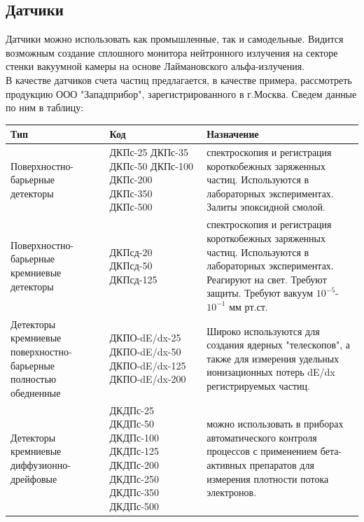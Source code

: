 \documentclass[11pt]{report}
\begin{document}
\subsection{Датчики}
Датчики можно использовать как промышленные, так и самодельные. Видится возможным создание сплошного монитора нейтронного излучения на секторе стенки вакуумной камеры на основе Лаймановского альфа-излучения. \\

В качестве датчиков счета частиц предлагается, в качестве примера, рассмотреть продукцию ООО "Западприбор", зарегистрированного в г.Москва. Сведем данные по ним в таблицу:\\
\begin{tabular}{|p{2.5cm}|p{3.5cm}|p{8.5cm}|}
\hline
	Тип & Код & Назначение\\
\hline
	Поверхностно-барьерные детекторы  & ДКПс-25 \linebreak ДКПс-35 \linebreak ДКПс-50 \linebreak ДКПс-100 \linebreak ДКПс-200 \linebreak ДКПс-350 \linebreak ДКПс-500 & спектроскопия и регистрация короткобежных заряженных частиц. Используются в лабораторных экспериментах. Залиты эпоксидной смолой.\\
\hline
	Поверхностно-барьерные кремниевые детекторы  & ДКПсд-20 \linebreak ДКПсд-50 \linebreak ДКПсд-125 & спектроскопия и регистрация короткобежных заряженных частиц. Используются в лабораторных экспериментах. Реагируют на свет. Требуют защиты. Требуют вакуум $10^{-5}$-$10^{-1}$ мм рт.ст.\\
\hline
	Детекторы кремниевые поверхностно-барьерные полностью обедненные & ДКПО-dE/dx-25 \linebreak ДКПО-dE/dx-50 \linebreak ДКПО-dE/dx-125 \linebreak ДКПО-dE/dx-200 & Широко используются для создания ядерных "телескопов", а также для измерения удельных ионизационных потерь dE/dx регистрируемых частиц.\\
\hline
	Детекторы кремниевые диффузионно-дрейфовые & ДКДПс-25 \linebreak ДКДПс-50 \linebreak ДКДПс-100 \linebreak ДКДПс-125 \linebreak ДКДПс-200 \linebreak ДКДПс-250 \linebreak ДКДПс-350 \linebreak ДКДПс-500 & можно использовать в приборах автоматического контроля процессов с применением бета-активных препаратов для измерения плотности потока электронов.\\

\end{tabular}
\end{document}
